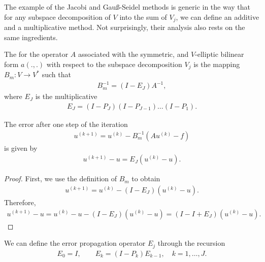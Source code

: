 \begin{intro}
  The example of the Jacobi and Gauß-Seidel methods is generic in the
  way that for any subspace decomposition of $V$ into the sum of
  $V_j$, we can define an additive and a multiplicative method. Not
  surprisingly, their analysis also rests on the same ingredients.
\end{intro}

\begin{definition}
  The  for the operator $A$ associated
  with the symmetric, and $V$-elliptic bilinear form $a(.,.)$ with
  respect to the subspace decomposition $V_j$ is the mapping $B_m:
  V \to V^*$ such that
  \begin{gather}
    \label{eq:schwarz:34}
    B_m^{-1} = (I -  E_J) A^{-1},
  \end{gather}
  where $E_J$ is the multiplicative 
  \begin{gather}
    \label{eq:schwarz:35}
    E_J = (I - P_J)(I - P_{J-1})\dots(I - P_1).
  \end{gather}
\end{definition}

\begin{lemma}
  The error after one step of the iteration
  \begin{gather*}
    u^{(k+1)} = u^{(k)} - B_m^{-1}\left(A u^{(k)} - f\right)
  \end{gather*}
  is given by
  \begin{gather*}
    u^{(k+1)} - u = E_J \left(u^{(k)} - u\right).
  \end{gather*}
\end{lemma}

\begin{proof}
  First, we use the definition of $B_m$ to obtain
  \begin{gather*}
    u^{(k+1)} = u^{(k)} - (I -  E_J) \left(u^{(k)} - u\right).
  \end{gather*}
  Therefore,
  \begin{gather*}
    u^{(k+1)} - u = u^{(k)} - u - (I -  E_J) \left(u^{(k)} - u\right)
    = (I-I+E_J) \left(u^{(k)} - u\right).
  \end{gather*}  
\end{proof}

\begin{remark}
  We can define the error propagation operator $E_j$ through the
  recursion
  \begin{gather}
    \label{eq:schwarz:45}
    E_{0} = I, \qquad E_{k} = (I - P_k) E_{k-1}, \quad k=1,\dots,J.
  \end{gather}
\end{remark}

